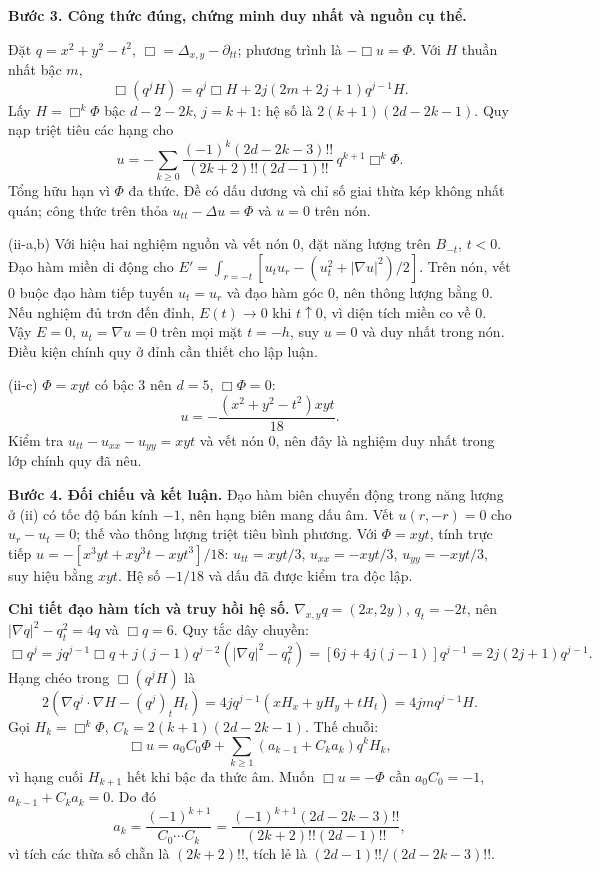 \documentclass[10pt,a4paper]{article}
\begin{document}
\textbf{Bước 3. Công thức đúng, chứng minh duy nhất và nguồn cụ thể.}

Đặt $q=x^2+y^2-t^2$, $\Box=\Delta_{x,y}-\partial_{tt}$; phương trình là $-\Box u=\Phi$. Với $H$ thuần nhất bậc $m$,
\[\Box(q^jH)=q^j\Box H+2j(2m+2j+1)q^{j-1}H.\]
Lấy $H=\Box^k\Phi$ bậc $d-2-2k$, $j=k+1$: hệ số là $2(k+1)(2d-2k-1)$. Quy nạp triệt tiêu các hạng cho
\[u=-\sum_{k\ge0}\frac{(-1)^k(2d-2k-3)!!}{(2k+2)!!(2d-1)!!}\,q^{k+1}\Box^k\Phi.\]
Tổng hữu hạn vì $\Phi$ đa thức. Đề có dấu dương và chỉ số giai thừa kép không nhất quán; công thức trên thỏa $u_{tt}-\Delta u=\Phi$ và $u=0$ trên nón.

(ii-a,b) Với hiệu hai nghiệm nguồn và vết nón 0, đặt năng lượng trên $B_{-t}$, $t<0$. Đạo hàm miền di động cho $E'=\int_{r=-t}[u_tu_r-(u_t^2+|\nabla u|^2)/2]$. Trên nón, vết 0 buộc đạo hàm tiếp tuyến $u_t=u_r$ và đạo hàm góc 0, nên thông lượng bằng 0. Nếu nghiệm đủ trơn đến đỉnh, $E(t)\to0$ khi $t\uparrow0$, vì diện tích miền co về 0. Vậy $E=0$, $u_t=\nabla u=0$ trên mọi mặt $t=-h$, suy $u=0$ và duy nhất trong nón. Điều kiện chính quy ở đỉnh cần thiết cho lập luận.

(ii-c) $\Phi=xyt$ có bậc 3 nên $d=5$, $\Box\Phi=0$:
\[u=-\frac{(x^2+y^2-t^2)xyt}{18}.\]
Kiểm tra $u_{tt}-u_{xx}-u_{yy}=xyt$ và vết nón 0, nên đây là nghiệm duy nhất trong lớp chính quy đã nêu.

\textbf{Bước 4. Đối chiếu và kết luận.} Đạo hàm biên chuyển động trong năng lượng ở (ii) có tốc độ bán kính $-1$, nên hạng biên mang dấu âm. Vết $u(r,-r)=0$ cho $u_r-u_t=0$; thế vào thông lượng triệt tiêu bình phương. Với $\Phi=xyt$, tính trực tiếp $u=-[x^3yt+xy^3t-xyt^3]/18$: $u_{tt}=xyt/3$, $u_{xx}=-xyt/3$, $u_{yy}=-xyt/3$, suy hiệu bằng $xyt$. Hệ số $-1/18$ và dấu đã được kiểm tra độc lập.

\textbf{Chi tiết đạo hàm tích và truy hồi hệ số.} $\nabla_{x,y}q=(2x,2y)$, $q_t=-2t$, nên $|\nabla q|^2-q_t^2=4q$ và $\Box q=6$. Quy tắc dây chuyền:
\[\Box q^j=j q^{j-1}\Box q+j(j-1)q^{j-2}(|\nabla q|^2-q_t^2)
=[6j+4j(j-1)]q^{j-1}=2j(2j+1)q^{j-1}.\]
Hạng chéo trong $\Box(q^jH)$ là
\[2(\nabla q^j\cdot\nabla H-(q^j)_tH_t)
=4jq^{j-1}(xH_x+yH_y+tH_t)=4jmq^{j-1}H.\]
Gọi $H_k=\Box^k\Phi$, $C_k=2(k+1)(2d-2k-1)$. Thế chuỗi:
\[\Box u=a_0C_0\Phi+\sum_{k\ge1}(a_{k-1}+C_ka_k)q^kH_k,\]
vì hạng cuối $H_{k+1}$ hết khi bậc đa thức âm. Muốn $\Box u=-\Phi$ cần $a_0C_0=-1$, $a_{k-1}+C_ka_k=0$. Do đó
\[a_k=\frac{(-1)^{k+1}}{C_0\cdots C_k}
=\frac{(-1)^{k+1}(2d-2k-3)!!}{(2k+2)!!(2d-1)!!},\]
vì tích các thừa số chẵn là $(2k+2)!!$, tích lẻ là $(2d-1)!!/(2d-2k-3)!!$.
\end{document}
